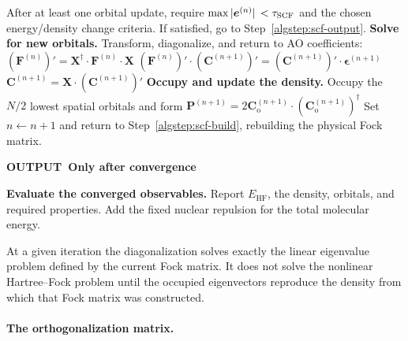 \documentclass[11pt,a4paper,titlepage]{article}
\numberwithin{equation}{section}
\newcommand{\EHF}{E_\text{HF}}
\newcommand{\be}{\boldsymbol{e}}
\newcommand{\bC}{\boldsymbol{C}}
\newcommand{\bF}{\boldsymbol{F}}
\newcommand{\bP}{\boldsymbol{P}}
\newcommand{\bX}{\boldsymbol{X}}
\newcommand{\beps}{\boldsymbol{\epsilon}}
\begin{document}
\begin{hfscfsummary}[phantom={\label{alg:rhf-scf-summary}}]
\begin{algorithmic}[1]
  \Statex After at least one orbital update, require
    $\max\abs*{\be^{(n)}}<\tau_\text{SCF}$ and the chosen energy/density
    change criteria. If satisfied, go to Step~\ref{algstep:scf-output}.
  \State \textbf{Solve for new orbitals.}\label{algstep:scf-solve}
    Transform, diagonalize, and return to AO coefficients:
  \Statex $\displaystyle
    (\bF^{(n)})'
      =\bX^\dag\cdot\bF^{(n)}\cdot\bX$
  \Statex $\displaystyle
    (\bF^{(n)})'\cdot(\bC^{(n+1)})'
      =(\bC^{(n+1)})'\cdot\beps^{(n+1)}$
  \Statex $\displaystyle
    \bC^{(n+1)}=\bX\cdot(\bC^{(n+1)})'$
  \State \textbf{Occupy and update the density.}\label{algstep:scf-update}
    Occupy the $N/2$ lowest spatial orbitals and form
  \Statex $\displaystyle
    \bP^{(n+1)}=2\bC_\text{o}^{(n+1)}\cdot
      (\bC_\text{o}^{(n+1)})^\dag$
  \Statex Set $n\leftarrow n+1$ and return to
    Step~\ref{algstep:scf-build}, rebuilding the physical Fock matrix.
  \Statex \smallskip
    \colorbox{hfGreenLight}{\strut\textcolor{hfGreenDark}{\bfseries
      OUTPUT\enspace\textbar\ Only after convergence}}
  \State \textbf{Evaluate the converged observables.}\label{algstep:scf-output}
    Report $\EHF$, the density, orbitals, and required properties.
    Add the fixed nuclear repulsion for the total molecular energy.
\end{algorithmic}
\end{hfscfsummary}

At a given iteration the diagonalization solves exactly the linear
eigenvalue problem defined by the current Fock matrix. It does not solve the
nonlinear Hartree--Fock problem until the occupied eigenvectors reproduce the
density from which that Fock matrix was constructed.

\paragraph{The orthogonalization matrix.}
\end{document}
